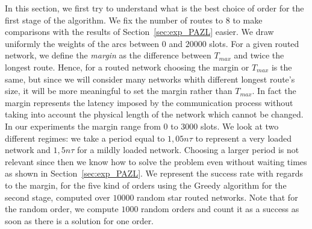 \documentclass[10pt, conference, letterpaper]{IEEEtran}
\begin{document}
    
    In this section, we first try to understand what is the best choice of order for the first stage of the algorithm.
    We fix the number of routes to $8$ to make comparisons with the results of Section~\ref{sec:exp_PAZL} easier. 
    We draw uniformly the weights of the arcs between $0$ and $20000$ slots.
    For a given routed network, we define the {\em margin} as the difference between $T_{max}$ and twice the longest route. 
    Hence, for a routed network choosing the margin or $T_{max}$ is the same, but since we will consider many networks 
    whith different longest route's size, it will be more meaningful to set the margin rather than $T_{max}$.
    In fact the margin represents the latency imposed by the communication process without taking into account the physical length of the network which cannot be changed. In our experiments the margin range from  $0$ to $3000$ slots.
   We look at two different regimes: we take a period equal to $1,05n\tau$ to represent a very loaded network
   and $1,5n\tau$ for a mildly loaded network. Choosing a larger period is not relevant since then we know how to solve the problem even without waiting times as shown in Section~\ref{sec:exp_PAZL}. We represent the success rate with regards to the margin, for the five kind of orders using the Greedy algorithm for the second stage, computed over $10000$ random star routed networks. Note that for the random order, we compute $1000$ random orders and count it as a success as soon as there is a solution for one order. 
 
\end{document}
